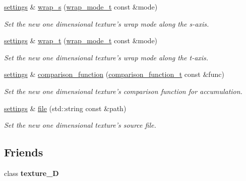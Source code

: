 \begin{DoxyCompactItemize}
\hyperlink{classgfx_1_1texture__1D_1_1settings}{settings} \& \hyperlink{classgfx_1_1texture__1D_1_1settings_a375bc5be608ea4800db27839dd9aa5e6}{wrap\-\_\-s} (\hyperlink{classgfx_1_1wrap__mode__t}{wrap\-\_\-mode\-\_\-t} const \&mode)
\begin{DoxyCompactList}\small\item\em Set the new one dimensional texture's wrap mode along the s-\/axis. \end{DoxyCompactList}\item 
\hyperlink{classgfx_1_1texture__1D_1_1settings}{settings} \& \hyperlink{classgfx_1_1texture__1D_1_1settings_a606bbf3b1c842756aacd1c20da6e0d96}{wrap\-\_\-t} (\hyperlink{classgfx_1_1wrap__mode__t}{wrap\-\_\-mode\-\_\-t} const \&mode)
\begin{DoxyCompactList}\small\item\em Set the new one dimensional texture's wrap mode along the t-\/axis. \end{DoxyCompactList}\item 
\hyperlink{classgfx_1_1texture__1D_1_1settings}{settings} \& \hyperlink{classgfx_1_1texture__1D_1_1settings_a58a2c831c91cea871d3680dc8f3a063d}{comparison\-\_\-function} (\hyperlink{classgfx_1_1comparison__function__t}{comparison\-\_\-function\-\_\-t} const \&func)
\begin{DoxyCompactList}\small\item\em Set the new one dimensional texture's comparison function for accumulation. \end{DoxyCompactList}\item 
\hyperlink{classgfx_1_1texture__1D_1_1settings}{settings} \& \hyperlink{classgfx_1_1texture__1D_1_1settings_aa2213bf07f2883a0e919bd3b9b22bce2}{file} (std\-::string const \&path)
\begin{DoxyCompactList}\small\item\em Set the new one dimensional texture's source file. \end{DoxyCompactList}\end{DoxyCompactItemize}
\subsection*{Friends}
\begin{DoxyCompactItemize}
\item 
\hypertarget{classgfx_1_1texture__1D_1_1settings_a2039d67f6166ccf823c78e3476aad9aa}{class {\bfseries texture\-\_\-D}}\label{classgfx_1_1texture__1D_1_1settings_a2039d67f6166ccf823c78e3476aad9aa}

\end{DoxyCompactItemize}



